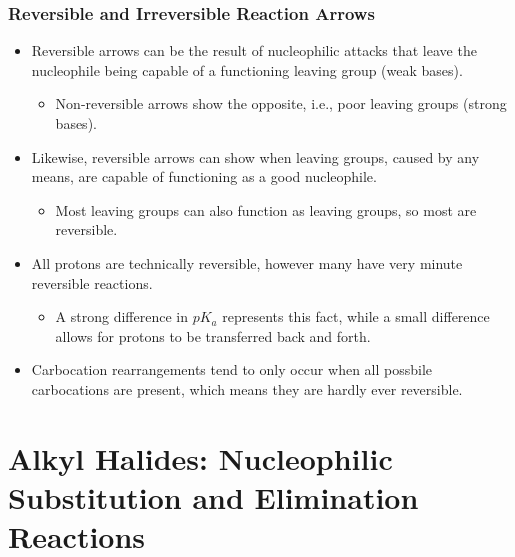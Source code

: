 \documentclass[12pt,a4paper]{article}
\begin{document}
\begin{itemize}
    \subsubsection{Reversible and Irreversible Reaction Arrows}
    \begin{itemize}
        \item Reversible arrows can be the result of nucleophilic attacks that leave the nucleophile being capable of a functioning leaving group (weak bases).
            \begin{itemize}
                \item Non-reversible arrows show the opposite, i.e., poor leaving groups (strong bases). 
            \end{itemize}
        \item Likewise, reversible arrows can show when leaving groups, caused by any means, are capable of functioning as a good nucleophile.
            \begin{itemize}
                \item Most leaving groups can also function as leaving groups, so most are reversible.
            \end{itemize}
        \item All protons are technically reversible, however many have very minute reversible reactions.
            \begin{itemize}
                \item A strong difference in \(pK_a\) represents this fact, while a small difference allows for protons to be transferred back and forth.
            \end{itemize}
        \item Carbocation rearrangements tend to only occur when all possbile carbocations are present, which means they are hardly ever reversible.
    \end{itemize}
\end{itemize}

\clearpage
\section{Alkyl Halides: Nucleophilic Substitution and Elimination Reactions}
\end{document}
